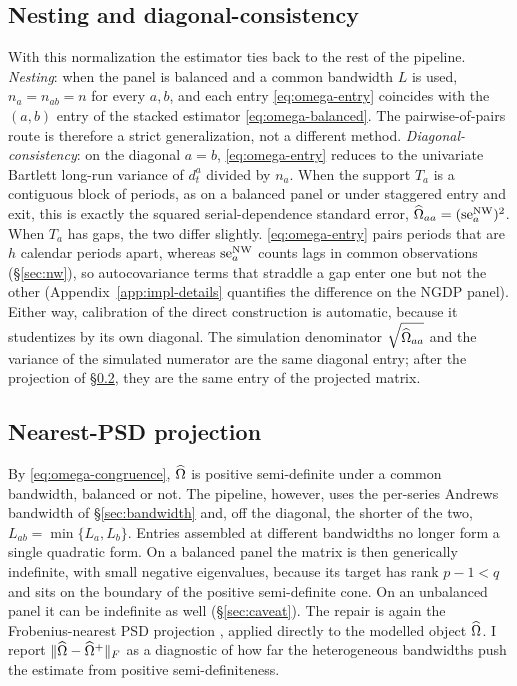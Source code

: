 \subsection{Nesting and diagonal-consistency}
\label{sec:omega-nesting}

With this normalization the estimator ties back to the rest of the pipeline.
\emph{Nesting}: when the panel is balanced and a common bandwidth $L$ is used,
$n_a=n_{ab}=n$ for every $a,b$, and each entry \eqref{eq:omega-entry} coincides with the
$(a,b)$ entry of the stacked estimator \eqref{eq:omega-balanced}. The pairwise-of-pairs
route is therefore a strict generalization, not a different method.
\emph{Diagonal-consistency}: on the diagonal $a=b$, \eqref{eq:omega-entry} reduces to
the univariate Bartlett long-run variance of $d^a_t$ divided by $n_a$. When the support
$T_a$ is a contiguous block of periods, as on a balanced panel or under staggered entry
and exit, this is exactly the squared serial-dependence standard error,
$\widehat{\Omega}_{aa} = (\mathrm{se}^{\mathrm{NW}}_{a})^2$. When $T_a$ has gaps, the two differ slightly.
\eqref{eq:omega-entry} pairs periods that are $h$ calendar periods apart, whereas
$\mathrm{se}^{\mathrm{NW}}_{a}$ counts lags in common observations (\S\ref{sec:nw}), so autocovariance terms
that straddle a gap enter one but not the other (Appendix~\ref{app:impl-details}
quantifies the difference on the NGDP panel). Either way, calibration of the direct
construction is automatic, because it studentizes by its own diagonal. The simulation
denominator $\sqrt{\widehat{\Omega}_{aa}}$ and the variance of the simulated numerator are the
same diagonal entry; after the projection of \S\ref{sec:omega-psd}, they are the same
entry of the projected matrix.

\subsection{Nearest-PSD projection}
\label{sec:omega-psd}

By \eqref{eq:omega-congruence}, $\widehat{\Omega}$ is positive semi-definite under a common
bandwidth, balanced or not. The pipeline, however, uses the per-series Andrews bandwidth
of \S\ref{sec:bandwidth} and, off the diagonal, the shorter of the two,
$L_{ab}=\min\{L_a,L_b\}$. Entries assembled at different bandwidths no longer form a
single quadratic form. On a balanced panel the matrix is then generically indefinite,
with small negative eigenvalues, because its target has rank $p-1<q$ and sits on the
boundary of the positive semi-definite cone. On an unbalanced panel it can be indefinite
as well (\S\ref{sec:caveat}). The repair is again the Frobenius-nearest PSD projection
\citep{higham1988}, applied directly to the modelled object $\widehat{\Omega}$. I report
$\lVert \widehat{\Omega}-\widehat{\Omega}^{+} \rVert_{F}$ as a diagnostic of how far the heterogeneous bandwidths
push the estimate from positive semi-definiteness.

